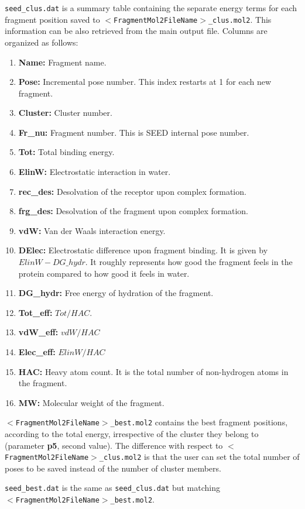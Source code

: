 \documentclass[a4paper,12pt,titlepage]{article}
\begin{document}
\noindent
\texttt{seed\_clus.dat} is a summary table containing the separate energy terms for each fragment position saved to {\tt $<$FragmentMol2FileName$>$\_clus.mol2}. This information can be also retrieved from the main output file. Columns are organized as follows:
\begin{enumerate}
\item \textbf{Name:} Fragment name.
\item \textbf{Pose:} Incremental pose number. This index restarts at 1 for each new fragment.
\item \textbf{Cluster:} Cluster number.
\item \textbf{Fr\_nu:} Fragment number. This is SEED internal pose number.
\item \textbf{Tot:} Total binding energy.
\item \textbf{ElinW:} Electrostatic interaction in water.
\item \textbf{rec\_des:} Desolvation of the receptor upon complex formation.
\item \textbf{frg\_des:} Desolvation of the fragment upon complex formation.
\item \textbf{vdW:} Van der Waals interaction energy.
\item \textbf{DElec:} Electrostatic difference upon fragment binding. It is given by $ElinW-DG\_hydr$. It roughly represents how good the fragment feels in the protein compared to how good it feels in water. 
\item \textbf{DG\_hydr:} Free energy of hydration of the fragment.
\item \textbf{Tot\_eff:} $Tot/HAC$.
\item \textbf{vdW\_eff:} $vdW/HAC$
\item \textbf{Elec\_eff:} $ElinW/HAC$ 
\item \textbf{HAC:} Heavy atom count. It is the total number of non-hydrogen atoms in the fragment.
\item \textbf{MW:} Molecular weight of the fragment.
\end{enumerate}

\noindent
{\tt $<$FragmentMol2FileName$>$\_best.mol2} contains the best fragment positions, according to the total energy, irrespective of the cluster they belong to (parameter \textbf{p5}, second value). The difference with respect to {\tt $<$FragmentMol2FileName$>$\_clus.mol2} is that the user can set the total number of poses to be saved instead of the number of cluster members.

\noindent
\texttt{seed\_best.dat} is the same as \texttt{seed\_clus.dat} but matching \\{\tt $<$FragmentMol2FileName$>$\_best.mol2}.
\end{document}

